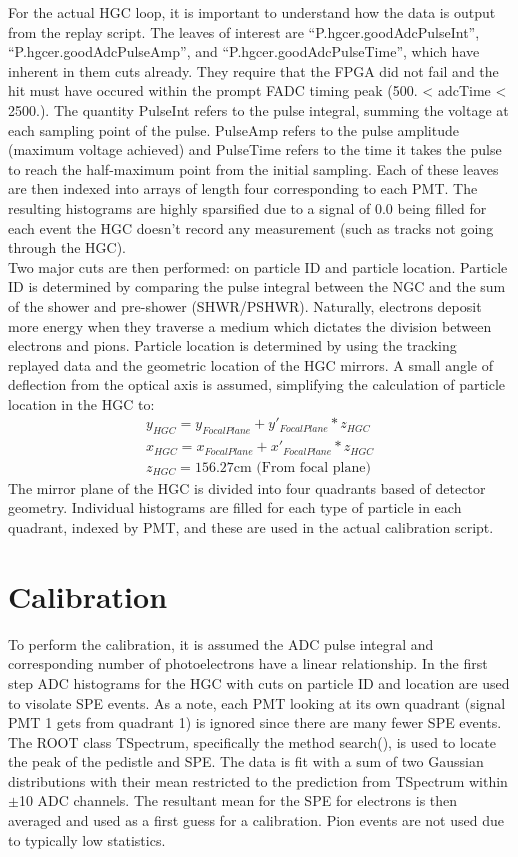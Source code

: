 \documentclass[12pt,letterpaper]{article}
\begin{document}
For the actual HGC loop, it is important to understand how the data is output from the replay script. The leaves of interest are ``P.hgcer.goodAdcPulseInt'', ``P.hgcer.goodAdcPulseAmp'', and ``P.hgcer.goodAdcPulseTime'', which have inherent in them cuts already. They require that the FPGA did not fail and the hit must have occured within the prompt FADC timing peak (500. < adcTime < 2500.). The quantity PulseInt refers to the pulse integral, summing the voltage at each sampling point of the pulse. PulseAmp refers to the pulse amplitude (maximum voltage achieved) and PulseTime refers to the time it takes the pulse to reach the half-maximum point from the initial sampling. Each of these leaves are then indexed into arrays of length four corresponding to each PMT. The resulting histograms are highly sparsified due to a signal of 0.0 being filled for each event the HGC doesn't record any measurement (such as tracks not going through the HGC). \\

Two major cuts are then performed: on particle ID and particle location. Particle ID is determined by comparing the pulse integral between the NGC and the sum of the shower and pre-shower (SHWR/PSHWR). Naturally, electrons deposit more energy when they traverse a medium which dictates the division between electrons and pions. Particle location is determined by using the tracking replayed data and the geometric location of the HGC mirrors. A small angle of deflection from the optical axis is assumed, simplifying the calculation of particle location in the HGC to:
\begin{eqnarray*}
y_{HGC} = y_{Focal Plane} + y'_{Focal Plane}* z_{HGC} \\
x_{HGC} = x_{Focal Plane} + x'_{Focal Plane}* z_{HGC} \\
z_{HGC} = 156.27\text{cm (From focal plane)}
\end{eqnarray*} 
The mirror plane of the HGC is divided into four quadrants based of detector geometry. Individual histograms are filled for each type of particle in each quadrant, indexed by PMT, and these are used in the actual calibration script. 

\section{Calibration}

To perform the calibration, it is assumed the ADC pulse integral and corresponding number of photoelectrons have a linear relationship. In the first step ADC histograms for the HGC with cuts on particle ID and location are used to visolate SPE events. As a note, each PMT looking at its own quadrant (signal PMT 1 gets from quadrant 1) is ignored since there are many fewer SPE events. The ROOT class TSpectrum, specifically the method search(), is used to locate the peak of the pedistle and SPE. The data is fit with a sum of two Gaussian distributions with their mean restricted to the prediction from TSpectrum within $\pm$10 ADC channels. The resultant mean for the SPE for electrons is then averaged and used as a first guess for a calibration. Pion events are not used due to typically low statistics. \\
\end{document}
